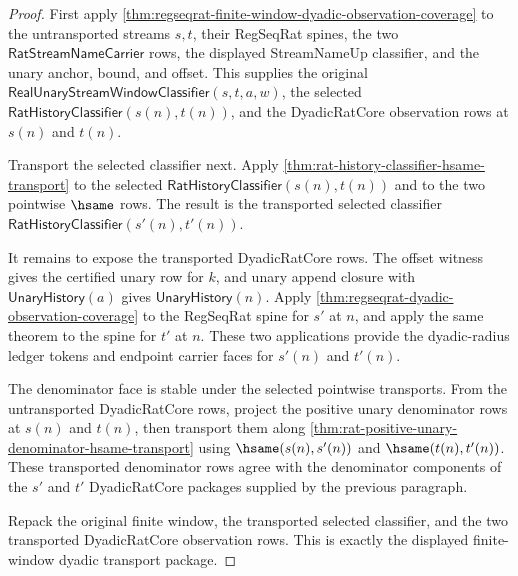 \begin{proof}
First apply
\autoref{thm:regseqrat-finite-window-dyadic-observation-coverage} to the
untransported streams $s,t$, their RegSeqRat spines, the two
$\mathsf{RatStreamNameCarrier}$ rows, the displayed StreamNameUp classifier,
and the unary anchor, bound, and offset. This supplies the original
$\mathsf{RealUnaryStreamWindowClassifier}(s,t,a,w)$, the selected
$\mathsf{RatHistoryClassifier}(s(n),t(n))$, and the DyadicRatCore observation
rows at $s(n)$ and $t(n)$.

Transport the selected classifier next. Apply
\autoref{thm:rat-history-classifier-hsame-transport} to the selected
$\mathsf{RatHistoryClassifier}(s(n),t(n))$ and to the two pointwise
$\hsame$ rows. The result is the transported selected classifier
$\mathsf{RatHistoryClassifier}(s'(n),t'(n))$.

It remains to expose the transported DyadicRatCore rows. The offset witness
gives the certified unary row for $k$, and unary append closure with
$\mathsf{UnaryHistory}(a)$ gives $\mathsf{UnaryHistory}(n)$. Apply
\autoref{thm:regseqrat-dyadic-observation-coverage} to the RegSeqRat spine
for $s'$ at $n$, and apply the same theorem to the spine for $t'$ at $n$.
These two applications provide the dyadic-radius ledger tokens and endpoint
carrier faces for $s'(n)$ and $t'(n)$.

The denominator face is stable under the selected pointwise transports. From
the untransported DyadicRatCore rows, project the positive unary denominator
rows at $s(n)$ and $t(n)$, then transport them along
\autoref{thm:rat-positive-unary-denominator-hsame-transport} using
$\hsame(s(n),s'(n))$ and $\hsame(t(n),t'(n))$. These transported denominator
rows agree with the denominator components of the $s'$ and $t'$ DyadicRatCore
packages supplied by the previous paragraph.

Repack the original finite window, the transported selected classifier, and
the two transported DyadicRatCore observation rows. This is exactly the
displayed finite-window dyadic transport package.
\end{proof}

